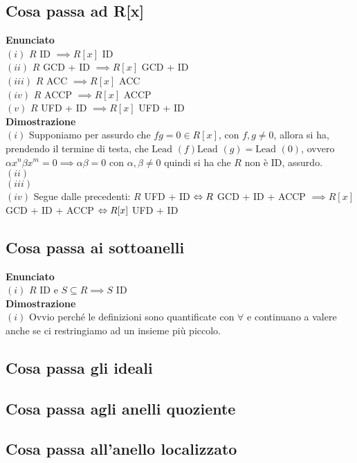 \documentclass[a4paper,GeneralMath,NoNotes]{stdmdoc}
\newcommand{\Enunciato}{\vskip 0.05cm \noindent \textbf{Enunciato} \\ }
\renewcommand{\Dimostrazione}{\vskip 0.05cm \noindent \textbf{Dimostrazione} \\ }
\newcommand{\Lead}{\text{Lead }}
\begin{document}
	
	\subsection{Cosa passa ad R[x]}
	\Enunciato
		$(i)$ $R$ ID $\implies R[x]$ ID \\
		$(ii)$ $R$ GCD + ID $\implies R[x]$ GCD + ID \\
		$(iii)$ $R$ ACC $\implies R[x]$ ACC \\
		$(iv)$ $R$ ACCP $\implies R[x]$ ACCP \\
		$(v)$ $R$ UFD + ID $\implies R[x]$ UFD + ID \\

	\Dimostrazione
		$(i)$ Supponiamo per assurdo che $fg = 0 \in R[x]$, con $f, g \neq 0$, allora si ha, prendendo il termine di testa, che $\Lead(f)\Lead(g) = \Lead(0)$, ovvero $\alpha x^n \beta x^m = 0 \implies \alpha \beta = 0$ con $\alpha, \beta \neq 0$ quindi si ha che $R$ non è ID, assurdo. \\
		$(ii)$ \\
		$(iii)$ \\
		$(iv)$ Segue dalle precedenti: $R$ UFD + ID $\Leftrightarrow R$ GCD + ID + ACCP $\implies R[x]$ GCD + ID + ACCP $\Leftrightarrow R[x]$ UFD + ID \\


	\subsection{Cosa passa ai sottoanelli}
	\Enunciato
		$(i)$ $R$ ID e $S \subseteq R \implies S$ ID \\

	\Dimostrazione
		$(i)$ Ovvio perché le definizioni sono quantificate con $\forall$ e continuano a valere anche se ci restringiamo ad un insieme più piccolo.

	\subsection{Cosa passa gli ideali}

	\subsection{Cosa passa agli anelli quoziente}

	\subsection{Cosa passa all'anello localizzato}
\end{document}
